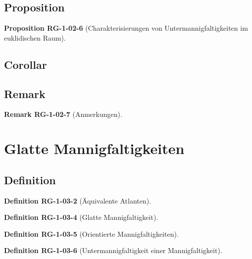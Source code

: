 \documentclass[10pt, letterpaper]{article}
\newcommand{\CustomHeading}[3]{%
  \par\medskip\noindent%
  \textbf{#1 #2} \textnormal{(#3)}.\enskip%
}
\newenvironment{DEF}[2]{\CustomHeading{Definition}{#1}{#2}}{}
\newenvironment{PROP}[2]{\CustomHeading{Proposition}{#1}{#2}}{}
\newenvironment{REM}[2]{\CustomHeading{Remark}{#1}{#2}}{}
\begin{document}
\subsection{Proposition}

\begin{PROP}{RG-1-02-6}{Charakterisierungen von Untermannigfaltigkeiten im euklidischen Raum}

\end{PROP}








\subsection{Corollar}







\subsection{Remark}

\begin{REM}{RG-1-02-7}{Anmerkungen}

\end{REM}




\section{Glatte Mannigfaltigkeiten}

\subsection{Definition}

\begin{DEF}{RG-1-03-2}{Äquivalente Atlanten}

\end{DEF}

\begin{DEF}{RG-1-03-4}{Glatte Mannigfaltigkeit}

\end{DEF}

\begin{DEF}{RG-1-03-5}{Orientierte Mannigfaltigkeiten}

\end{DEF}

\begin{DEF}{RG-1-03-6}{Untermannigfaltigkeit einer Mannigfaltigkeit}

\end{DEF}
\end{document}
